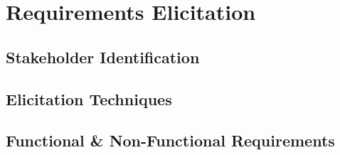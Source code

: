 \chapter{Requirements Elicitation}
\label{chap:requirements_elicitation}

\section{Stakeholder Identification}

\section{Elicitation Techniques}

\section{Functional \& Non-Functional Requirements}
